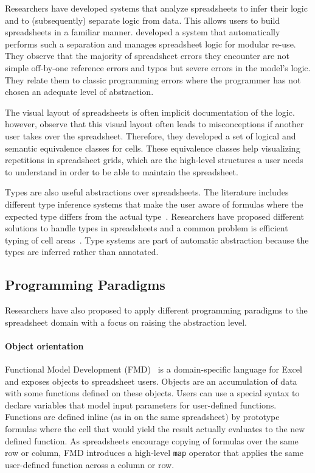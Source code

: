 \documentclass[a4paper]{article}
\begin{document}
Researchers have developed systems that analyze spreadsheets to infer their logic and to (subsequently) separate logic from data. This allows users to build spreadsheets in a familiar manner. \citet{Isakowitz:1995:TLT:195705.195708} developed a system that automatically performs such a separation and manages spreadsheet logic for modular re-use. They observe that the majority of spreadsheet errors they encounter are not simple off-by-one reference errors and typos but severe errors in the model's logic. They relate them to classic programming errors where the programmer has not chosen an adequate level of abstraction.

The visual layout of spreadsheets is often implicit documentation of the logic. \citet{1173080} however, observe that this visual layout often leads to misconceptions if another user takes over the spreadsheet. Therefore, they developed a set of logical and semantic equivalence classes for cells. These equivalence classes help visualizing repetitions in spreadsheet grids, which are the high-level structures a user needs to understand in order to be able to maintain the spreadsheet.

Types are also useful abstractions over spreadsheets. The literature includes different type inference systems that make the user aware of formulas where the expected type differs from the actual type~\cite{Abraham:2006:TIS:1140335.1140346, Cheng2015Static}. Researchers have proposed different solutions to handle types in spreadsheets and a common problem is efficient typing of cell areas~\cite{Abraham:2006:TIS:1140335.1140346, Cheng2012Abstract}. Type systems are part of automatic abstraction because the types are inferred rather than annotated.

\subsection{Programming Paradigms}
\label{sec:progr-parad}

Researchers have also proposed to apply different programming paradigms to the spreadsheet domain with a focus on raising the abstraction level.

\paragraph{Object orientation}

Functional Model Development (FMD)~\cite{Benfield:2009:FFD:1668113.1668121} is a domain-specific language for Excel and exposes objects to spreadsheet users. Objects are an accumulation of data with some functions defined on these objects. Users can use a special syntax to declare variables that model input parameters for user-defined functions. Functions are defined inline (as in on the same spreadsheet) by prototype formulas where the cell that would yield the result actually evaluates to the new defined function. As spreadsheets encourage copying of formulas over the same row or column, FMD introduces a high-level \texttt{map} operator that applies the same user-defined function across a column or row.
\end{document}
